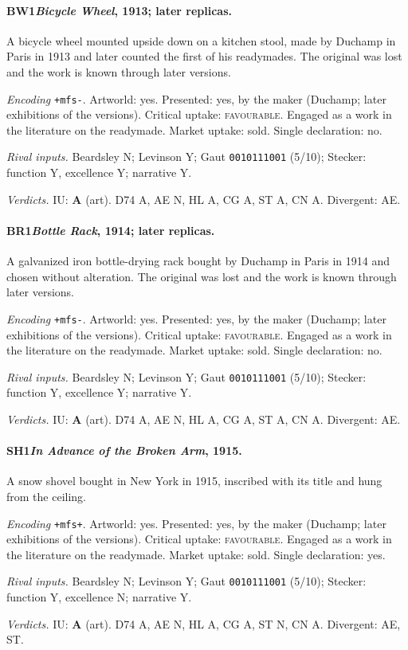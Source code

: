 \paragraph{BW1\enspace \emph{Bicycle Wheel}, 1913; later replicas.}
A bicycle wheel mounted upside down on a kitchen stool, made by Duchamp in Paris in 1913 and later counted the first of his readymades. The original was lost and the work is known through later versions.\par
\noindent\textit{Encoding} \texttt{+mfs-}. Artworld: yes. Presented: yes, by the maker (Duchamp; later exhibitions of the versions). Critical uptake: \textsc{favourable}. Engaged as a work in the literature on the readymade. Market uptake: sold. Single declaration: no.\par
\noindent\textit{Rival inputs.} Beardsley N; Levinson Y; Gaut \texttt{0010111001} (5/10); Stecker: function Y, excellence Y; narrative Y.\par
\noindent\textit{Verdicts.} IU: \textbf{A} (art). D74 A, AE N, HL A, CG A, ST A, CN A. Divergent: AE.\par

\paragraph{BR1\enspace \emph{Bottle Rack}, 1914; later replicas.}
A galvanized iron bottle-drying rack bought by Duchamp in Paris in 1914 and chosen without alteration. The original was lost and the work is known through later versions.\par
\noindent\textit{Encoding} \texttt{+mfs-}. Artworld: yes. Presented: yes, by the maker (Duchamp; later exhibitions of the versions). Critical uptake: \textsc{favourable}. Engaged as a work in the literature on the readymade. Market uptake: sold. Single declaration: no.\par
\noindent\textit{Rival inputs.} Beardsley N; Levinson Y; Gaut \texttt{0010111001} (5/10); Stecker: function Y, excellence Y; narrative Y.\par
\noindent\textit{Verdicts.} IU: \textbf{A} (art). D74 A, AE N, HL A, CG A, ST A, CN A. Divergent: AE.\par

\paragraph{SH1\enspace \emph{In Advance of the Broken Arm}, 1915.}
A snow shovel bought in New York in 1915, inscribed with its title and hung from the ceiling.\par
\noindent\textit{Encoding} \texttt{+mfs+}. Artworld: yes. Presented: yes, by the maker (Duchamp; later exhibitions of the versions). Critical uptake: \textsc{favourable}. Engaged as a work in the literature on the readymade. Market uptake: sold. Single declaration: yes.\par
\noindent\textit{Rival inputs.} Beardsley N; Levinson Y; Gaut \texttt{0010111001} (5/10); Stecker: function Y, excellence N; narrative Y.\par
\noindent\textit{Verdicts.} IU: \textbf{A} (art). D74 A, AE N, HL A, CG A, ST N, CN A. Divergent: AE, ST.\par

